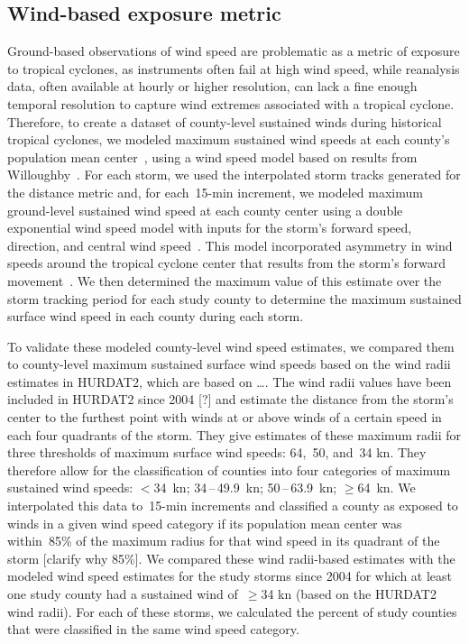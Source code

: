 \subsection*{Wind-based exposure metric}

Ground-based observations of wind speed are problematic as a metric of exposure
to tropical cyclones, as instruments often fail at high wind speed, while
reanalysis data, often available at hourly or higher resolution, can lack a
fine enough temporal resolution to capture wind extremes associated with a
tropical cyclone. Therefore, to create a dataset of county-level sustained
winds during historical tropical cyclones, we modeled maximum sustained wind
speeds at each county's population mean center~\parencite{countycenters}, using
a wind speed model based on results from
Willoughby~\parencite{willoughby2006parametric}. For each storm, we used the
interpolated storm tracks generated for the distance metric and, for
each~15-\si{\minute} increment, we modeled maximum ground-level sustained wind
speed at each county center using a double exponential wind speed model with
inputs for the storm's forward speed, direction, and central wind
speed~\parencite{willoughby2006parametric, stormwindmodel}. This model
incorporated asymmetry in wind speeds around the tropical cyclone center that
results from the storm's forward movement~\parencite{phadke2003modeling,
stormwindmodel}. We then determined the maximum value of this estimate over the
storm tracking period for each study county to determine the maximum sustained
surface wind speed in each county during each storm.

To validate these modeled county-level wind speed estimates, we compared them
to county-level maximum sustained surface wind speeds based on the wind radii
estimates in \ac{HURDAT2}, which are based on \ldots. The wind radii values
have been included in \ac{HURDAT2} since 2004 [?] and estimate the distance
from the storm's center to the furthest point with winds at or above winds of a
certain speed in each four quadrants of the storm. They give estimates of these
maximum radii for three thresholds of maximum surface wind speeds: 64,~50,
and~34 \si{\knot}.  They therefore allow for the classification of counties
into four categories of maximum sustained wind speeds: $<$34~\si{\knot};
34\,--\,49.9~\si{\knot}; 50\,--\,63.9~\si{\knot}; $\ge$64~\si{\knot}. We
interpolated this data to~15-\si{\minute} increments and classified a county as
exposed to winds in a given wind speed category if its population mean center
was within~85\% of the maximum radius for that wind speed in its quadrant of
the storm [clarify why 85\%]. We compared these wind radii-based estimates with
the modeled wind speed estimates for the study storms since 2004 for which at
least one study county had a sustained wind of~$\ge$34 \si{\knot} (based on the
\ac{HURDAT2} wind radii). For each of these storms, we calculated the percent
of study counties that were classified in the same wind speed category.

